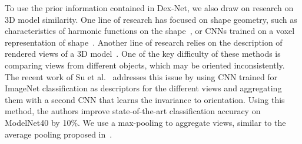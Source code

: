 To use the prior information contained in Dex-Net, we also draw on research on 3D model similarity.
One line of research has focused on shape geometry, such as characteristics of harmonic functions on the shape~\cite{bronstein2011shape}, or CNNs trained on a voxel representation of shape~\cite{maturana2015voxnet, wu20153d}.
Another line of research relies on the description of rendered views of a 3D model~\cite{chen2003visual, goldfeder2011data}.
One of the key difficulty of these methods is comparing views from different objects, which may be oriented inconsistently.
The recent work of Su et al.~\cite{su2015multi} addresses this issue by using CNN trained for ImageNet classification as descriptors for the different views and aggregating them with a second CNN that learns the invariance to orientation.
Using this method, the authors improve state-of-the-art classification accuracy on ModelNet40 by 10\%.
We use a max-pooling to aggregate views, similar to the average pooling proposed in~\cite{aubry2015understanding}.

